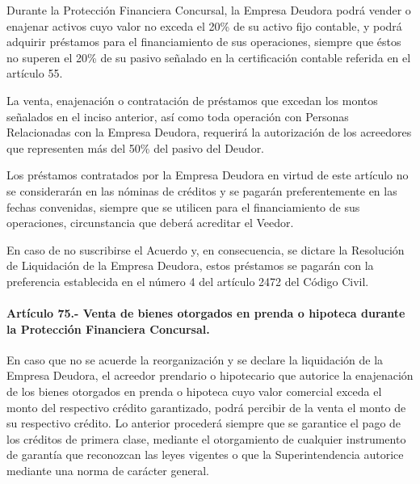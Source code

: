 \documentclass[
]{book}
\begin{document}
Durante la Protección Financiera Concursal, la Empresa Deudora podrá vender o enajenar activos cuyo valor no exceda el 20\% de su activo fijo contable, y podrá adquirir préstamos para el financiamiento de sus operaciones, siempre que éstos no superen el 20\% de su pasivo señalado en la certificación contable referida en el artículo 55.

La venta, enajenación o contratación de préstamos que excedan los montos señalados en el inciso anterior, así como toda operación con Personas Relacionadas con la Empresa Deudora, requerirá la autorización de los acreedores que representen más del 50\% del pasivo del Deudor.

Los préstamos contratados por la Empresa Deudora en virtud de este artículo no se considerarán en las nóminas de créditos y se pagarán preferentemente en las fechas convenidas, siempre que se utilicen para el financiamiento de sus operaciones, circunstancia que deberá acreditar el Veedor.

En caso de no suscribirse el Acuerdo y, en consecuencia, se dictare la Resolución de Liquidación de la Empresa Deudora, estos préstamos se pagarán con la preferencia establecida en el número 4 del artículo 2472 del Código Civil.

\hypertarget{artuxedculo-75.--venta-de-bienes-otorgados-en-prenda-o-hipoteca-durante-la-protecciuxf3n-financiera-concursal.}{%
\paragraph*{Artículo 75.- Venta de bienes otorgados en prenda o hipoteca durante la Protección Financiera Concursal.}\label{artuxedculo-75.--venta-de-bienes-otorgados-en-prenda-o-hipoteca-durante-la-protecciuxf3n-financiera-concursal.}}

En caso que no se acuerde la reorganización y se declare la liquidación de la Empresa Deudora, el acreedor prendario o hipotecario que autorice la enajenación de los bienes otorgados en prenda o hipoteca cuyo valor comercial exceda el monto del respectivo crédito garantizado, podrá percibir de la venta el monto de su respectivo crédito. Lo anterior procederá siempre que se garantice el pago de los créditos de primera clase, mediante el otorgamiento de cualquier instrumento de garantía que reconozcan las leyes vigentes o que la Superintendencia autorice mediante una norma de carácter general.
\end{document}
